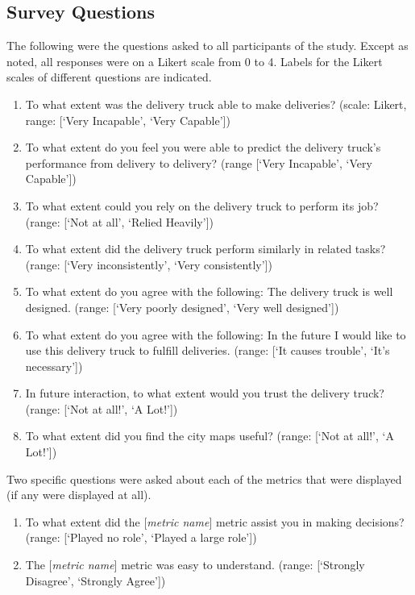 \subsection{Survey Questions} \label{sec:survey_questions}
The following were the questions asked to all participants of the study. Except as noted, all responses were on a Likert scale from 0 to 4. Labels for the Likert scales of different questions are indicated.


\begin{quoting}
\begin{enumerate}[label=\textbf{Survey~\arabic*)}]
    \item To what extent was the delivery truck able to make deliveries? (scale: Likert, range: [`Very Incapable', `Very Capable'])
    \item To what extent do you feel you were able to predict the delivery truck's performance from delivery to delivery? (range [`Very Incapable', `Very Capable'])
    \item To what extent could you rely on the delivery truck to perform its job? (range: [`Not at all', `Relied Heavily'])
    \item To what extent did the delivery truck perform similarly in related tasks? (range: [`Very inconsistently', `Very consistently'])
    \item To what extent do you agree with the following: The delivery truck is well designed. (range: [`Very poorly designed', `Very well designed'])
    \item To what extent do you agree with the following: In the future I would like to use this delivery truck to fulfill deliveries. (range: [`It causes trouble', `It's necessary'])
    \item In future interaction, to what extent would you trust the delivery truck? (range: [`Not at all!', `A Lot!'])
    \item To what extent did you find the city maps useful? (range: [`Not at all!', `A Lot!'])
\end{enumerate}
\end{quoting}

Two specific questions were asked about each of the \famsec{} metrics that were displayed (if any were displayed at all).
\begin{quoting}
\begin{enumerate}[label=\textbf{\famsec~\arabic*)}]
    \item To what extent did the [\emph{metric name}] metric assist you in making decisions? (range: [`Played no role', `Played a large role']) 
    \item The [\emph{metric name}] metric was easy to understand. (range: [`Strongly Disagree', `Strongly Agree']) 
\end{enumerate}
\end{quoting}

